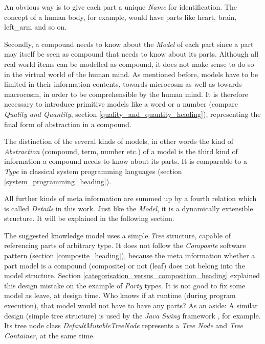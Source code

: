 An obvious way is to give each part a unique \emph{Name} for identification.
The concept of a human body, for example, would have parts like heart, brain,
left\_arm and so on.

Secondly, a compound needs to know about the \emph{Model} of each part since a
part may itself be seen as compound that needs to know about its parts. Although
all real world items can be modelled as compound, it does not make sense to do
so in the virtual world of the human mind. As mentioned before, models have to
be limited in their information contents, towards microcosm as well as towards
macrocosm, in order to be comprehensible by the human mind. It is therefore
necessary to introduce primitive models like a word or a number (compare
\emph{Quality and Quantity}, section \ref{quality_and_quantity_heading}),
representing the final form of abstraction in a compound.

The distinction of the several kinds of models, in other words the kind of
\emph{Abstraction} (compound, term, number etc.) of a model is the third
kind of information a compound needs to know about its parts. It is comparable
to a \emph{Type} in classical system programming languages (section
\ref{system_programming_heading}).

All further kinds of meta information are summed up by a fourth relation which
is called \emph{Details} in this work. Just like the \emph{Model}, it is a
dynamically extensible structure. It will be explained in the following section.

The suggested knowledge model uses a simple \emph{Tree} structure, capable of
referencing parts of arbitrary type. It does not follow the \emph{Composite}
software pattern (section \ref{composite_heading}), because the meta information
whether a part model is a compound (composite) or not (leaf) does not belong
into the model structure. Section \ref{categorisation_versus_composition_heading}
explained this design mistake on the example of \emph{Party} types. It is not
good to fix some model as leave, at design time. Who knows if at runtime
(during program execution), that model would not have to have any parts?
As an aside: A similar design (simple tree structure) is used by the
\emph{Java Swing} framework \cite{java}, for example. Its tree node class
\emph{DefaultMutableTreeNode} represents a \emph{Tree Node} and
\emph{Tree Container}, at the same time.
